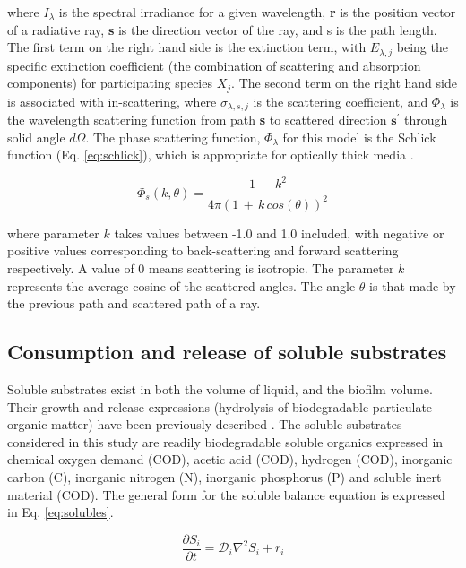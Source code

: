 where $I_\lambda$ is the spectral irradiance for a given wavelength, \textbf{r} is the position vector of a radiative ray, \textbf{s} is the direction vector of the ray, and s is the path length. The first term on the right hand side is the extinction term, with $E_{\lambda, j}$ being the specific extinction coefficient (the combination of scattering and absorption components) for participating species $X_j$. The second term on the right hand side is associated with in-scattering, where $\sigma_{\lambda, s, j}$ is the scattering coefficient, and $\Phi_\lambda$ is the wavelength scattering function from path \textbf{s} to scattered direction $\textbf{s}^\prime$ through solid angle $d\Omega$. The phase scattering function, $\Phi_\lambda$ for this model is the Schlick function (Eq. \ref{eq:schlick}), which is appropriate for optically thick media \cite{Jarosz2008}. 

\begin{equation}
\Phi_s(k, \theta) = \frac{1 \, -\,  k^2}{4\pi (1\, +\,k\, cos(\theta))^2 }
\end{equation}

where parameter $k$ takes values between -1.0 and 1.0 included, with negative or positive values corresponding to back-scattering and forward scattering respectively. A value of 0 means scattering is isotropic. The parameter $k$ represents the average cosine of the scattered angles. The angle $\theta$ is that made by the previous path and scattered path of a ray.

\subsection{Consumption and release of soluble substrates}
Soluble substrates exist in both the volume of liquid, and the biofilm volume. Their growth and release expressions (hydrolysis of biodegradable particulate organic matter) have been previously described \cite{Puyol2017}. The soluble substrates considered in this study are readily biodegradable soluble organics expressed in chemical oxygen demand (COD), acetic acid (COD), hydrogen (COD), inorganic carbon (C), inorganic nitrogen (N), inorganic phosphorus (P) and soluble inert material (COD). The general form for the soluble balance equation is expressed in Eq. \ref{eq:solubles}.

\begin{equation}
\label{eq:solubles}
\frac{\partial S_i}{\partial t} = \mathcal{D}_i\nabla^2 S_i + r_{i}
\end{equation}

